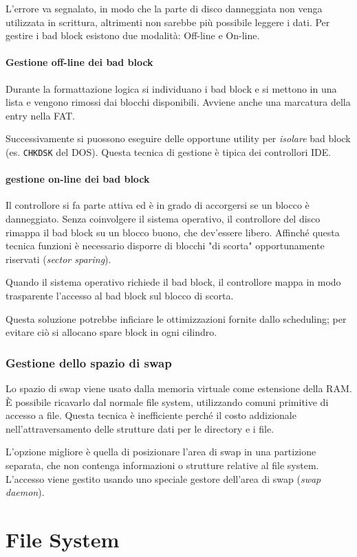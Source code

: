 \documentclass[a4paper,12pt, twoside]{report}
\begin{document}
L'errore va segnalato, in modo che la parte di disco danneggiata non venga utilizzata in scrittura, altrimenti
non sarebbe pi\`u possibile leggere i dati. Per gestire i bad block esistono due modalit\`a: Off-line e On-line.

\subsubsection{Gestione off-line dei bad block}
Durante la formattazione logica si individuano i bad block e si mettono in una lista e vengono rimossi dai blocchi
disponibili. Avviene anche una marcatura della entry nella FAT.

Successivamente si puossono eseguire delle opportune utility per \emph{isolare} bad block (es. \texttt{CHKDSK} del DOS).
Questa tecnica di gestione \`e tipica dei controllori IDE. 

\subsubsection{gestione on-line dei bad block}
Il controllore si fa parte attiva ed \`e in grado di accorgersi se un blocco \`e danneggiato. Senza coinvolgere
il sistema operativo, il controllore del disco rimappa il bad block su un blocco buono, che dev'essere libero. 
Affinch\'e questa tecnica funzioni \`e necessario disporre di blocchi "di scorta" opportunamente riservati (\emph{sector sparing}).

Quando il sistema operativo richiede il bad block, il controllore mappa in modo trasparente l'accesso al bad
block sul blocco di scorta. 

Questa soluzione potrebbe inficiare le ottimizzazioni fornite dallo scheduling; per evitare ci\`o si 
allocano spare block in ogni cilindro.

\subsection{Gestione dello spazio di swap}

Lo spazio di swap viene usato dalla memoria virtuale come estensione della RAM. \`E possibile ricavarlo
dal normale file system, utilizzando comuni primitive di accesso a file. Questa tecnica \`e inefficiente
perch\'e il costo addizionale nell'attraversamento delle strutture dati per le directory e i file. 

L'opzione migliore \`e quella di posizionare l'area di swap in una partizione separata, che non contenga informazioni
o strutture relative al file system. L'accesso viene gestito usando uno speciale gestore dell'area di swap 
(\emph{swap daemon}).

\chapter{File System}
\end{document}
